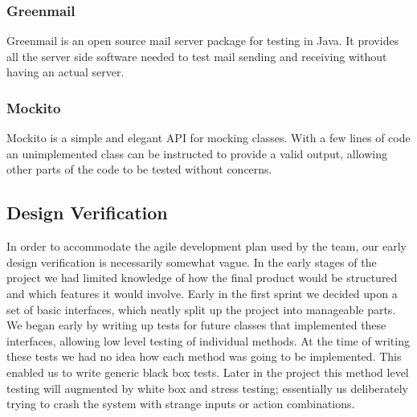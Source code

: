 \subsubsection{Greenmail}
Greenmail is an open source mail server package for testing in Java. It provides all the server side software needed to test mail sending and receiving without having an actual server.


\subsubsection{Mockito}
Mockito is a simple and elegant API for mocking classes. With a few lines of code an unimplemented class can be instructed to provide a valid output, allowing other parts of the code to be tested without concerns.

\subsection{Design Verification}
In order to accommodate the agile development plan used by the team, our early design verification is necessarily somewhat vague. In the early stages of the project we had limited knowledge of how the final product would be structured and which features it would involve.
\newline
\newline
Early in the first sprint we decided upon a set of basic interfaces, which neatly split up the project into manageable parts. We began early by writing up tests for future classes that implemented these interfaces, allowing low level testing of individual methods. At the time of writing these tests we had no idea how each method was going to be implemented. This enabled us to write generic black box tests.
\newline
\newline
Later in the project this method level testing will augmented by white box and stress testing; essentially us deliberately trying to crash the system with strange inputs or action combinations. 

